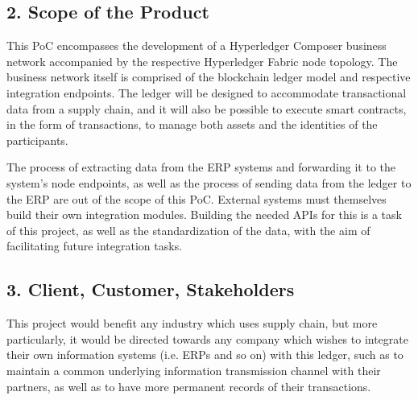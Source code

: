 \subsection*{2. Scope of the Product}
		\par This PoC encompasses the development of a Hyperledger Composer business network accompanied by the respective Hyperledger Fabric node topology. The business network itself is comprised of the blockchain ledger model and respective integration endpoints. The ledger will be designed to accommodate transactional data from a supply chain, and it will also be possible to execute smart contracts, in the form of transactions, to manage both assets and the identities of the participants.
		\par The process of extracting data from the ERP systems and forwarding it to the system's node endpoints, as well as the process of sending data from the ledger to the ERP are out of the scope of this PoC. External systems must themselves build their own integration modules. Building the needed APIs for this is a task of this project, as well as the standardization of the data, with the aim of facilitating future integration tasks.
	
    \subsection*{3. Client, Customer, Stakeholders}
	
	 This project would benefit any industry which uses supply chain, but more particularly, it would be directed towards any company which wishes to integrate their own information systems (i.e. ERPs and so on) with this ledger, such as to maintain a common underlying information transmission channel with their partners, as well as to have more permanent records of their transactions. 
	 
